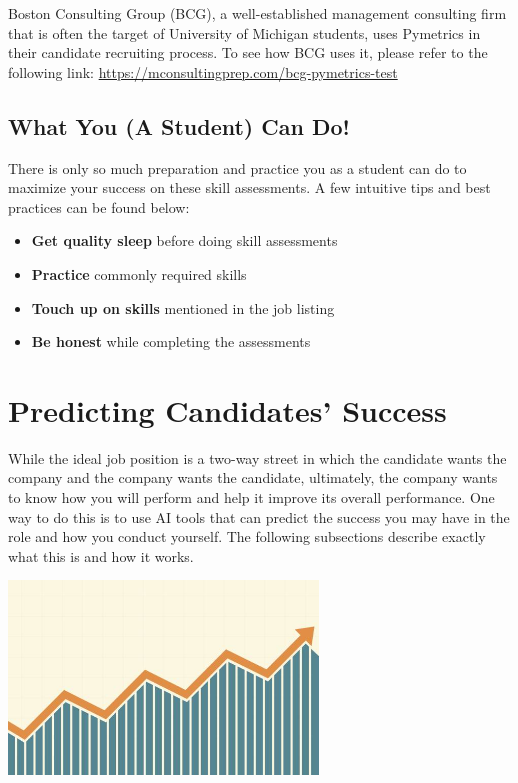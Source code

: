 \documentclass[
]{book}
\begin{document}
Boston Consulting Group (BCG), a well-established management consulting firm that is often the target of University of Michigan students, uses Pymetrics in their candidate recruiting process. To see how BCG uses it, please refer to the following link: \url{https://mconsultingprep.com/bcg-pymetrics-test}

\hypertarget{what-you-a-student-can-do-3}{%
\section{What You (A Student) Can Do!}\label{what-you-a-student-can-do-3}}

There is only so much preparation and practice you as a student can do to maximize your success on these skill assessments. A few intuitive tips and best practices can be found below:

\begin{itemize}
\item
  \textbf{Get quality sleep} before doing skill assessments
\item
  \textbf{Practice} commonly required skills
\item
  \textbf{Touch up on skills} mentioned in the job listing
\item
  \textbf{Be honest} while completing the assessments
\end{itemize}

\hypertarget{predicting-candidates-success}{%
\chapter{Predicting Candidates' Success}\label{predicting-candidates-success}}

While the ideal job position is a two-way street in which the candidate wants the company and the company wants the candidate, ultimately, the company wants to know how you will perform and help it improve its overall performance. One way to do this is to use AI tools that can predict the success you may have in the role and how you conduct yourself. The following subsections describe exactly what this is and how it works.

\includegraphics[width=3.23958in,height=\textheight]{predict success.jpg}
\end{document}
